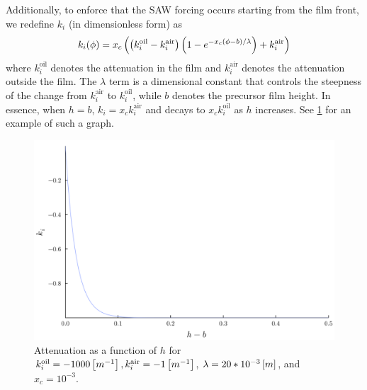 Additionally, to enforce that the SAW forcing occurs starting from the film front, we redefine 
$k_i$ (in dimensionless form) as 
\begin{align}
    k_i\!\left( \phi \right) = x_c \left( \left( k_i^{\text{oil}} - k_i^{\text{air}} \right)\left( 1 - e^{-x_c(\phi-b)/\lambda} \right) + k_i^{\text{air}} \right)
    \label{eq:k_i}
\end{align}
where $k_i^{\text{oil}}$ denotes the attenuation in the film and $k_i^{\text{air}}$ denotes the attenuation
outside the film. The $\lambda$ term is a dimensional constant that controls the steepness of the change from $k_i^{\text{air}}$ to $k_i^{\text{oil}}$, 
while $b$ denotes the precursor film height. In essence, when $h = b$, $k_i = x_c k_i^{\text{air}}$ and  
decays to $x_c k_i^{\text{oil}}$ as $h$ increases. See \cref{fig:attenuation} for an example of such a graph. 

\begin{figure}[ht]
    \centering
    \includegraphics[scale=0.25]{images/attenuation.png}
    \caption{Attenuation as a function of $h$ for $k_i^{\text{oil}} = -1000 \left[ m^{-1} \right], k_i^{\text{air}} = -1 \left[ m^{-1} \right]$, 
    $\lambda = 20*10^{-3} \left[ m \right]$, and $x_c = 10^{-3}$.} 
    \label{fig:attenuation}
\end{figure}